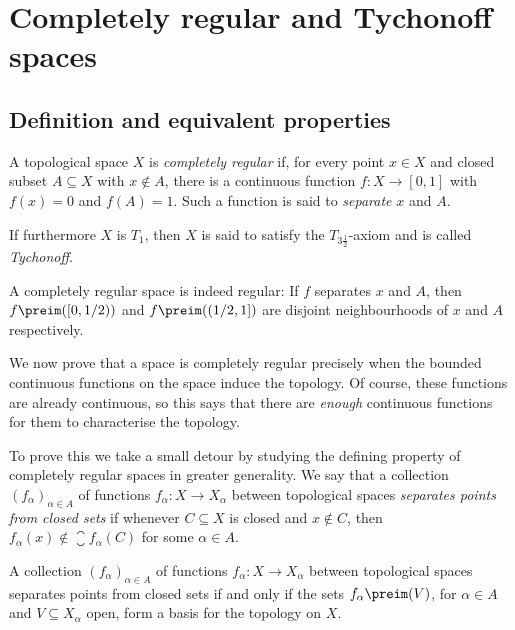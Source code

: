 \documentclass[article, a4paper, 11pt, oneside]{memoir}
\numberwithin{equation}{chapter}
\begin{document}
\chapter{Completely regular and Tychonoff spaces}

\section{Definition and equivalent properties}

\begin{definition}
    A topological space $X$ is \emph{completely regular} if, for every point $x \in X$ and closed subset $A \subseteq X$ with $x \not\in A$, there is a continuous function $f \colon X \to [0,1]$ with $f(x) = 0$ and $f(A) = 1$. Such a function is said to \emph{separate} $x$ and $A$.

    If furthermore $X$ is $T_1$, then $X$ is said to satisfy the $T_{3\frac{1}{2}}$-axiom and is called \emph{Tychonoff}.
\end{definition}
%
A completely regular space is indeed regular: If $f$ separates $x$ and $A$, then $f\preim([0,1/2))$ and $f\preim((1/2,1])$ are disjoint neighbourhoods of $x$ and $A$ respectively.

We now prove that a space is completely regular precisely when the bounded continuous functions on the space induce the topology. Of course, these functions are already continuous, so this says that there are \emph{enough} continuous functions for them to characterise the topology.

To prove this we take a small detour by studying the defining property of completely regular spaces in greater generality. We say that a collection $(f_\alpha)_{\alpha \in A}$ of functions $f_\alpha \colon X \to X_\alpha$ between topological spaces \emph{separates points from closed sets} if whenever $C \subseteq X$ is closed and $x \not\in C$, then $f_\alpha(x) \not\in \closure{f_\alpha(C)}$ for some $\alpha \in A$.

\begin{proposition}
    \label{thm:separating-points-from-closed-sets-basis}
    A collection $(f_\alpha)_{\alpha \in A}$ of functions $f_\alpha \colon X \to X_\alpha$ between topological spaces separates points from closed sets if and only if the sets $f_\alpha\preim(V)$, for $\alpha \in A$ and $V \subseteq X_\alpha$ open, form a basis for the topology on $X$.
\end{proposition}
\end{document}
